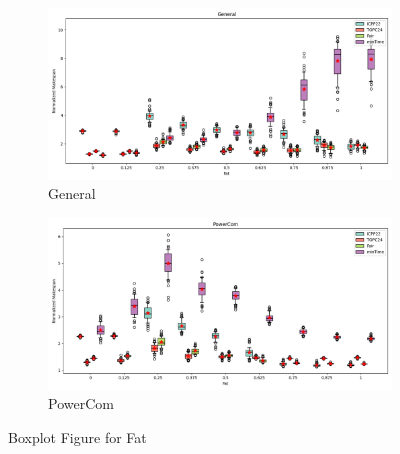 \documentclass{article}
\begin{document}
\begin{figure}[htbp]
\\[2ex]
\begin{subfigure}[b]{0.32\textwidth}\includegraphics[width=\textwidth]{Results/Fat/Fat_General_boxplot}\caption{General}\label{fig:boxplot_figures_Fat_General}\end{subfigure}
\hfill
\begin{subfigure}[b]{0.32\textwidth}\includegraphics[width=\textwidth]{Results/Fat/Fat_PowerCom_boxplot}\caption{PowerCom}\label{fig:boxplot_figures_Fat_PowerCom}\end{subfigure}
\hfill
\caption{Boxplot Figure for Fat}
\label{fig:boxplot_figures_Fat}
\end{figure}
\end{document}
